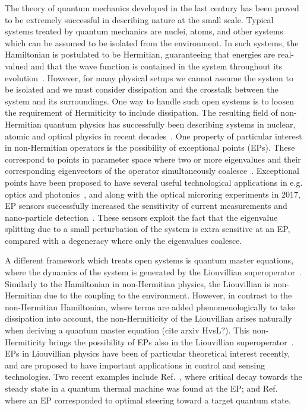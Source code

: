 \documentclass[../main.tex]{subfiles}
\begin{document}
The theory of quantum mechanics developed in the last century has been proved to be extremely successful in describing nature at the small scale. Typical systems treated by quantum mechanics are nuclei, atoms, and other systems which can be assumed to be isolated from the environment. In such systems, the Hamiltonian is postulated to be Hermitian, guaranteeing that energies are real-valued and that the wave function is contained in the system throughout its evolution~\cite{sakurai}. However, for many physical setups we cannot assume the system to be isolated and we must consider dissipation and the crosstalk between the system and its surroundings. One way to handle such open systems is to loosen the requirement of Hermiticity to include dissipation. The resulting field of non-Hermitian quantum physics has successfully been describing systems in nuclear, atomic and optical physics in recent decades~\cite{nonHermrev}. One property of particular interest in non-Hermitian operators is the possibility of exceptional points (EPs). These correspond to points in parameter space where two or more eigenvalues and their corresponding eigenvectors of the operator simultaneously coalesce~\cite{ep_expl}. Exceptional points have been proposed to have several useful technological applications in e.g. optics and photonics~\cite{eptechrev1,eptechrev2}, and along with the optical microring experiments in 2017, EP sensors successfully increased the sensitivity of current measurements and nano-particle detection~\cite{microring1, microring2}. These sensors exploit the fact that the eigenvalue splitting due to a small perturbation of the system is extra sensitive at an EP, compared with a degeneracy where only the eigenvalues coalesce.

A different framework which treats open systems is quantum master equations, where the dynamics of the system is generated by the Liouvillian superoperator~\cite{bookopen}. Similarly to the Hamiltonian in non-Hermitian physics, the Liouvillian is non-Hermitian due to the coupling to the environment. However, in contrast to the non-Hermitian Hamiltonian, where terms are added phenomenologically to take dissipation into account, the non-Hermiticity of the Liouvillian arises naturally when deriving a quantum master equation (cite arxiv HvsL?). This non-Hermiticity brings the possibility of EPs also in the Liouvillian superoperator~\cite{HEPvsLEP}. EPs in Liouvillian physics have been of particular theoretical interest recently, and are proposed to have important applications in control and sensing technologies. Two recent examples include Ref.~\cite{thermal}, where critical decay towards the steady state in a quantum thermal machine was found at the EP; and Ref.~\cite{steering} where an EP corresponded to optimal steering toward a target quantum state.
\end{document}
